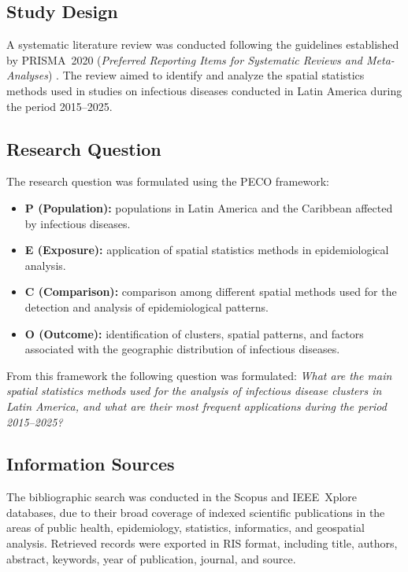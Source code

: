 \documentclass[runningheads]{llncs}
\begin{document}
\subsection{Study Design}

A systematic literature review was conducted following the
guidelines established by PRISMA~2020 (\textit{Preferred
Reporting Items for Systematic Reviews and Meta-Analyses})
\cite{Page2021}. The review aimed to identify and analyze the
spatial statistics methods used in studies on infectious
diseases conducted in Latin America during the period
2015--2025.

\subsection{Research Question}

The research question was formulated using the PECO framework:

\begin{itemize}
  \item \textbf{P (Population):} populations in Latin America
    and the Caribbean affected by infectious diseases.
  \item \textbf{E (Exposure):} application of spatial
    statistics methods in epidemiological analysis.
  \item \textbf{C (Comparison):} comparison among different
    spatial methods used for the detection and analysis of
    epidemiological patterns.
  \item \textbf{O (Outcome):} identification of clusters,
    spatial patterns, and factors associated with the
    geographic distribution of infectious diseases.
\end{itemize}

From this framework the following question was formulated:
\textit{What are the main spatial statistics methods used for
the analysis of infectious disease clusters in Latin America,
and what are their most frequent applications during the
period 2015--2025?}

\subsection{Information Sources}

The bibliographic search was conducted in the Scopus and
IEEE~Xplore databases, due to their broad coverage of indexed
scientific publications in the areas of public health,
epidemiology, statistics, informatics, and geospatial
analysis. Retrieved records were exported in RIS format,
including title, authors, abstract, keywords, year of
publication, journal, and source.
\end{document}
